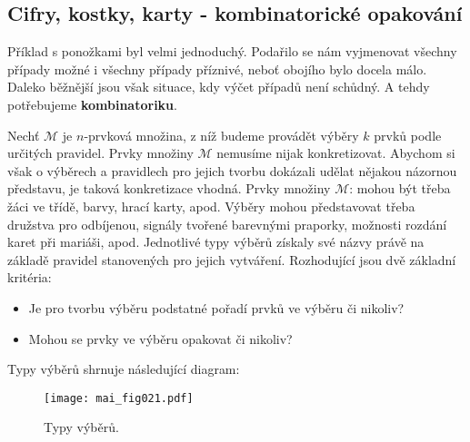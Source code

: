       
    \subsection{Cifry, kostky, karty - kombinatorické opakování}
      Příklad s ponožkami byl velmi jednoduchý. Podařilo se nám vyjmenovat všechny případy možné i 
      všechny případy příznivé, neboť obojího bylo docela málo. Daleko běžnější jsou však situace, 
      kdy výčet případů není schůdný. A tehdy potřebujeme \textbf{kombinatoriku}.
      
      Nechť \(\mathcal{M}\) je \(n\)-prvková množina, z níž budeme provádět výběry \(k\) prvků 
      podle určitých pravidel. Prvky množiny \(\mathcal{M}\) nemusíme nijak konkretizovat. Abychom 
      si však o výběrech a pravidlech pro jejich tvorbu dokázali udělat nějakou názornou představu, 
      je taková konkretizace vhodná. Prvky množiny \(\mathcal{M}\): mohou být třeba žáci ve třídě, 
      barvy, hrací karty, apod. Výběry mohou představovat třeba družstva pro odbíjenou, signály 
      tvořené barevnými praporky, možnosti rozdání karet při mariáši, apod. Jednotlivé typy výběrů 
      získaly své názvy právě na základě pravidel stanovených pro jejich vytváření. Rozhodující 
      jsou dvě základní kritéria:
      \begin{itemize}\addtolength{\itemsep}{-0.5\baselineskip}
        \item Je pro tvorbu výběru podstatné pořadí prvků ve výběru či nikoliv?
        \item Mohou se prvky ve výběru opakovat či nikoliv?
      \end{itemize}
      
      Typy výběrů shrnuje následující diagram:
      \begin{figure}[ht!] %
        \centering
        \texttt{[image: mai\_fig021.pdf]}
        \caption{Typy výběrů. \cite[s.~201]{Musilova2009MA1}}
        \label{mai:fig021}
      \end{figure}

